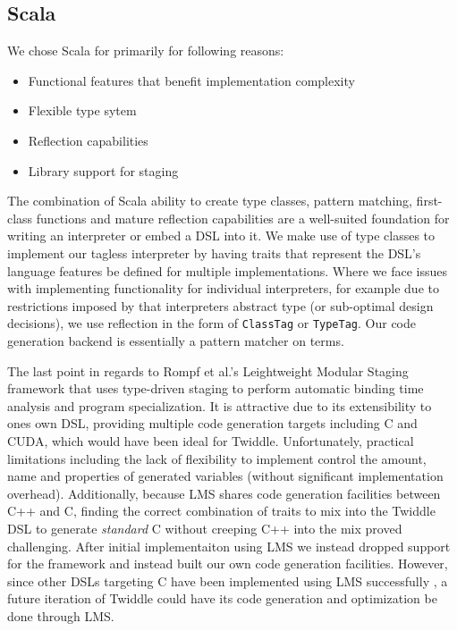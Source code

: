 \documentclass{article}
\begin{document}
\subsection{Scala}
We chose Scala for primarily for following reasons:
\begin{itemize}
	\item Functional features that benefit implementation complexity
	\item Flexible type sytem
	\item Reflection capabilities
	\item Library support for staging
\end{itemize}

The combination of Scala ability to create type classes, pattern matching, first-class functions and mature reflection capabilities are a well-suited foundation
for writing an interpreter or embed a DSL into it. We make use of type classes \cite{wadler1989make} to implement our tagless interpreter by having traits that represent
the DSL's language features be defined for multiple implementations. Where we face issues with implementing functionality for individual interpreters, for example due to restrictions imposed by
that interpreters abstract type (or sub-optimal design decisions), we use reflection in the form of \texttt{ClassTag} or \texttt{TypeTag}. Our code generation backend is essentially a
pattern matcher on terms.

The last point in regards to Rompf et al.'s Leightweight Modular Staging framework \cite{rompf2010lightweight} that uses type-driven staging to perform automatic binding time analysis and
program specialization. It is attractive due to its extensibility to ones own DSL, providing multiple code generation targets including C and CUDA, which would have been ideal for Twiddle. Unfortunately, practical
limitations including the lack of flexibility to implement control the amount, name and properties of generated variables (without significant implementation overhead). Additionally, because LMS shares code generation
facilities between C++ and C, finding the correct combination of traits to mix into the Twiddle DSL to generate \textit{standard} C without creeping C++ into the mix proved challenging. After initial implementaiton using LMS
we instead dropped support for the framework and instead built our own code generation facilities. However, since other DSLs targeting C have been implemented using LMS successfully \cite{lee2011implementing, amin2017lms}, a future iteration of Twiddle could have its
code generation and optimization be done through LMS.
\end{document}
